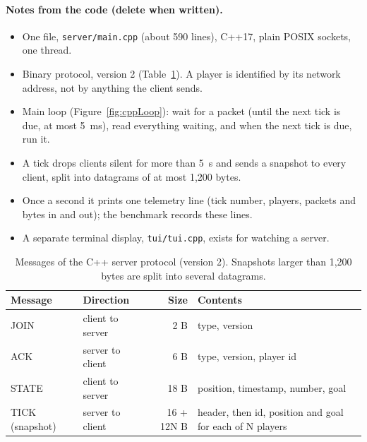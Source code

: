 \documentclass[11pt]{article}
\begin{document}
\paragraph{Notes from the code (delete when written).}
\begin{itemize}
\item One file, \texttt{server/main.cpp} (about 590 lines), C++17, plain POSIX sockets, one thread.
\item Binary protocol, version 2 (Table~\ref{tab:packets}). A player is identified by its network address, not by anything the client sends.
\item Main loop (Figure~\ref{fig:cppLoop}): wait for a packet (until the next tick is due, at most 5~ms), read everything waiting, and when the next tick is due, run it.
\item A tick drops clients silent for more than 5~s and sends a snapshot to every client, split into datagrams of at most 1,200 bytes.
\item Once a second it prints one telemetry line (tick number, players, packets and bytes in and out); the benchmark records these lines.
\item A separate terminal display, \texttt{tui/tui.cpp}, exists for watching a server.
\end{itemize}

\begin{table}[H]
\centering
\small
\begin{tabular}{@{}llrl@{}}
\toprule
Message & Direction & Size & Contents \\
\midrule
JOIN & client to server & 2 B & type, version \\
ACK & server to client & 6 B & type, version, player id \\
STATE & client to server & 18 B & position, timestamp, number, goal \\
TICK (snapshot) & server to client & 16 + 12N B & header, then id, position and goal for each of N players \\
\bottomrule
\end{tabular}
\caption{Messages of the C++ server protocol (version 2). Snapshots larger than 1,200 bytes are split into several datagrams.}
\label{tab:packets}
\end{table}
\end{document}
